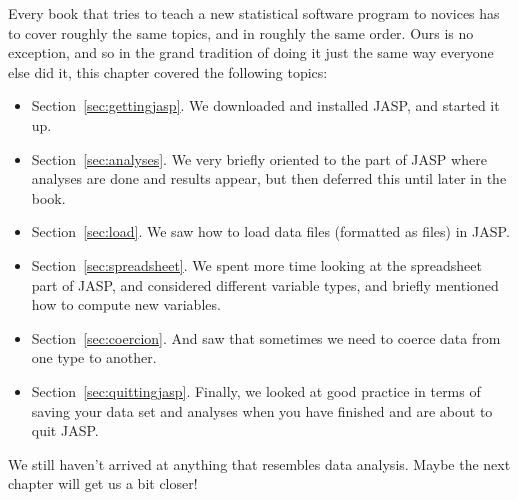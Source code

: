 Every book that tries to teach a new statistical software program to novices has to cover roughly the same topics, and in roughly the same order. Ours is no exception, and so in the grand tradition of doing it just the same way everyone else did it, this chapter covered the following topics:

\begin{itemize}
\item Section~\ref{sec:gettingjasp}. We downloaded and installed JASP, and started it up.
\item Section~\ref{sec:analyses}. We very briefly oriented to the part of JASP where analyses are done and results appear, but then deferred this until later in the book.
\item Section~\ref{sec:load}. We saw how to load data files (formatted as  files) in JASP.
\item Section~\ref{sec:spreadsheet}. We spent more time looking at the spreadsheet part of JASP, and considered different variable types, and briefly mentioned how to compute new variables.
\item Section~\ref{sec:coercion}. And saw that sometimes we need to coerce data from one type to another.
\item Section~\ref{sec:quittingjasp}. Finally, we looked at good practice in terms of saving your data set and analyses when you have finished and are about to quit JASP.
\end{itemize}

\noindent
We still haven't arrived at anything that resembles data analysis. Maybe the next chapter will get us a bit closer!



